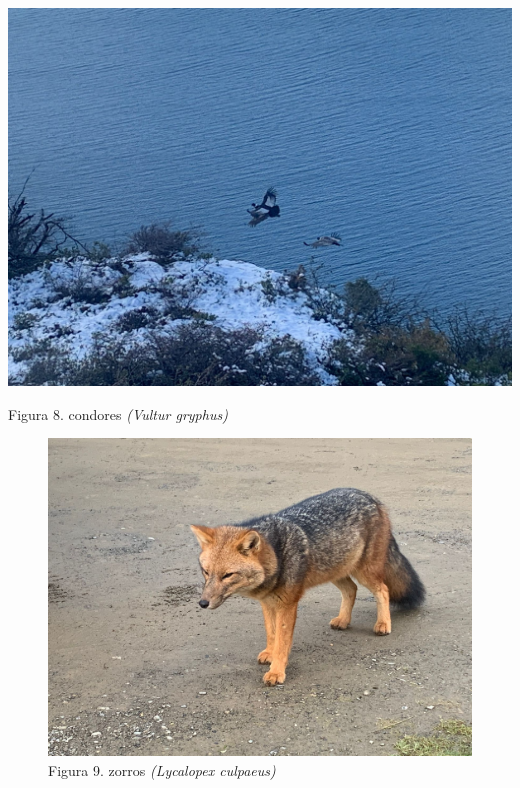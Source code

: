 \documentclass[
  letterpaper,
  DIV=11,
  numbers=noendperiod]{scrartcl}
\begin{document}
\includegraphics{WhatsApp Image 2023-09-06 at 12.58.03.jpeg}

Figura 8. condores \emph{(Vultur gryphus)}

\begin{figure}

{\centering \includegraphics{WhatsApp Image 2023-09-06 at 12.41.00.jpeg}

}

\caption{Figura 9. zorros \emph{(Lycalopex culpaeus)}}

\end{figure}
\end{document}
